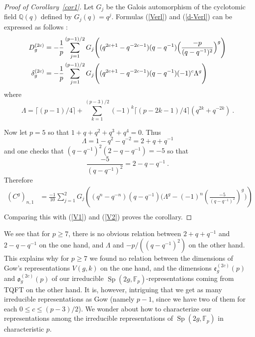 \documentclass{amsart}
\begin{document}
\begin{proof}[Proof of Corollary~\ref{cor1}]  Let $G_j$ be the Galois
  automorphism of the cyclotomic field ${{\mathbb{Q}}}(q)$ defined by
  $G_j(q)=q^j$. Formulas (\ref{Verl}) and (\ref{d-Verl}) can be
  expressed as follows \cite{GM4}: 
\begin{align}{\label{{V1}}{
	\if{n} y
		\smash{\makebox[0pt]{\hspace{-0.5in}
			\raisebox{8pt}{\tt\tiny {{V1}}}}}
	\fi
}}D_g^{(2c)}&=-
  \frac{1}{p} \sum_{j=1}^{(p-1)/2}  G_{j}
  \Bigg((q^{2c+1}-q^{-2c-1})(q-q^{-1})\Big(\frac{-p}{(q-q^{-1})^2}\Big)^g\Bigg)\\ {\label{{V2}}{
	\if{n} y
		\smash{\makebox[0pt]{\hspace{-0.5in}
			\raisebox{8pt}{\tt\tiny {{V2}}}}}
	\fi
}}
\delta_g^{(2c)}&=-
  \frac{1}{p} \sum_{j=1}^{(p-1)/2}  G_{j}
  \Bigg((q^{2c+1}-q^{-2c-1})(q-q^{-1})(-1)^c \Lambda^g\Bigg)
\end{align} where $$\Lambda = \lceil (p-1) /4 \rceil +  \sum_{k=1}^{(p-3)/2}(-1)^k \lceil
(p-2k-1)/ 4 \rceil  (q^{2k}+q^{-2k})~.$$ 

Now let $p=5$ so that $1+q+q^2+q^3+q^4=0$. Thus
$$\Lambda=1-q^2-q^{-2}=2+q+q^{-1}$$ and one checks that
$(q-q^{-1})^2(2-q-q^{-1})=-5$ so that $$ \frac{-5}{(q-q^{-1})^2}=
2-q-q^{-1}~.$$
Therefore \begin{align*}(C^g)_{n,1}&=\frac{-1}{10}\sum_{j=1}^{2} G_j\left(
  (q^{n}-q^{-n})(q-q^{-1 })\Bigg( \Lambda^{g} -(-1)^{n} \left(\frac{-5}{(q-q^{-1})^2}\right)^{g}
  \Bigg)\right)\\
\end{align*}
Comparing this with (\ref{V1}) and (\ref{V2}) proves the corollary.
\end{proof}
\vskip 8pt

  We see that for $p\geq 7$, there is no obvious
    relation between  $2+q+q^{-1}$ and
    $2-q-q^{-1}$ on the one hand, and $\Lambda$ and
    $-p/((q-q^{-1})^2)$ on the other hand. This explains why for
    $p\geq 7$ we found
    no  relation between the dimensions of 
Gow's representations  
$V(g,k)$ on the one hand,
    and the dimensions ${\mathfrak{e}}_g^{(2c)}(p)$ and
 ${\mathfrak{o}}_g^{(2c)}(p)$  
of our irreducible $\operatorname{Sp}(2g,{{\mathbb{F}}}_p)$-representations coming from TQFT  
on the other hand.  
It is, however, intriguing that we get as many irreducible
representations as Gow (namely $p-1$, since we have two of them for
each $0\leq c\leq 
(p-3)/2$). We wonder about how to characterize our
representations among the irreducible representations of
$\operatorname{Sp}(2g,{{\mathbb{F}}}_p)$ in characteristic $p$.
\end{document}
